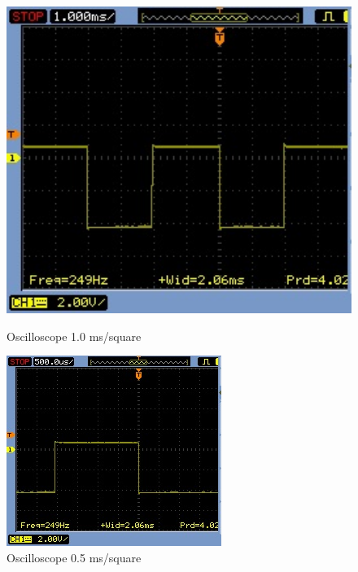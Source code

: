 \begin{figure}[H]
        \centering
         \begin{minipage}[b]{0.45\textwidth}
            \includegraphics[width = 1\textwidth]{VAPIQ-PICTURES/4ms1}
              \caption{Oscilloscope 1.0 ms/square}
            \label{fig:4ms1}
        \end{minipage}
        \hfill
        \begin{minipage}[b]{0.45\textwidth}
            \includegraphics[width = \textwidth]{VAPIQ-PICTURES/4ms2}
            \caption{Oscilloscope 0.5 ms/square}
            \label{fig:4ms2}
        \end{minipage}
\end{figure}

